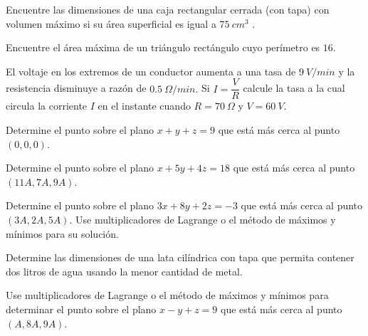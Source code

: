 \begin{prob}
Encuentre las dimensiones de una caja rectangular cerrada (con tapa) con volumen máximo si su área superficial es igual a $75\ cm^3$ .
\end{prob}

\begin{prob}
Encuentre el área máxima de un triángulo rectángulo cuyo perímetro es $16$.
\end{prob}

\begin{prob}
El voltaje en los extremos de un conductor aumenta a una tasa de $9\  V/min$ y la resistencia disminuye a razón de $0.5\ \Omega/min.$ Si $I=\dfrac{V}{R}$ calcule la tasa a la cual circula la corriente $I$ en el instante cuando $R=70\ \Omega$ y $V=60\ V.$
\end{prob}

\begin{prob}
Determine el punto sobre el plano $x+y+z=9$ que está más cerca al punto $(0,0,0).$
\end{prob}

\begin{prob}
Determine el punto sobre el plano $x+5y+4z=18$ que está más cerca al punto $(11A,7A,9A).$
\end{prob}

\begin{prob}
Determine el punto sobre el plano $3x+8y+2z=-3$ que está más cerca al punto $(3A,2A,5A).$ Use multiplicadores de Lagrange o el método de máximos y mínimos para su solución.
\end{prob}

\begin{prob}
Determine las dimensiones de una lata cilíndrica con tapa que permita contener dos litros de agua usando la menor cantidad de metal.
\end{prob}

\begin{prob}
Use multiplicadores de Lagrange o el método de máximos y mínimos para determinar el punto sobre el plano $x-y+z=9$ que está más cerca al punto $(A,8A,9A).$
\end{prob}

